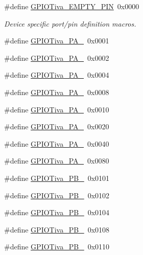 \begin{DoxyCompactItemize}
\item 
\#define \hyperlink{_g_p_i_o_tiva_8h_a2ec92551d8befb95d45bd4538cb551ff}{G\+P\+I\+O\+Tiva\+\_\+\+E\+M\+P\+T\+Y\+\_\+\+P\+I\+N}~0x0000
\begin{DoxyCompactList}\small\item\em Device specific port/pin definition macros. \end{DoxyCompactList}\item 
\#define \hyperlink{_g_p_i_o_tiva_8h_a27f805bf4a5d9103e4b274b21cc11c80}{G\+P\+I\+O\+Tiva\+\_\+\+P\+A\+\_}~0x0001
\item 
\#define \hyperlink{_g_p_i_o_tiva_8h_adcde1aba086cdeafa794b83300f1045a}{G\+P\+I\+O\+Tiva\+\_\+\+P\+A\+\_}~0x0002
\item 
\#define \hyperlink{_g_p_i_o_tiva_8h_afe7750cc0993a40eea174d8c884ebba8}{G\+P\+I\+O\+Tiva\+\_\+\+P\+A\+\_}~0x0004
\item 
\#define \hyperlink{_g_p_i_o_tiva_8h_a09f86a3824ca5fc59980cdc2a418ec14}{G\+P\+I\+O\+Tiva\+\_\+\+P\+A\+\_}~0x0008
\item 
\#define \hyperlink{_g_p_i_o_tiva_8h_a483f222ad65ae289af0ee4ee77f7572b}{G\+P\+I\+O\+Tiva\+\_\+\+P\+A\+\_}~0x0010
\item 
\#define \hyperlink{_g_p_i_o_tiva_8h_aff965c369c61586fcbf586066e154497}{G\+P\+I\+O\+Tiva\+\_\+\+P\+A\+\_}~0x0020
\item 
\#define \hyperlink{_g_p_i_o_tiva_8h_adb96d60aaa5ce688b602c543c1c3f554}{G\+P\+I\+O\+Tiva\+\_\+\+P\+A\+\_}~0x0040
\item 
\#define \hyperlink{_g_p_i_o_tiva_8h_aa894d37cf26b3c87e248be4a3a645d2b}{G\+P\+I\+O\+Tiva\+\_\+\+P\+A\+\_}~0x0080
\item 
\#define \hyperlink{_g_p_i_o_tiva_8h_aea38354a42e3ad6b9d446dd55e416549}{G\+P\+I\+O\+Tiva\+\_\+\+P\+B\+\_}~0x0101
\item 
\#define \hyperlink{_g_p_i_o_tiva_8h_a8b4d5da854e58d6afff1c2fb05603fe7}{G\+P\+I\+O\+Tiva\+\_\+\+P\+B\+\_}~0x0102
\item 
\#define \hyperlink{_g_p_i_o_tiva_8h_ad29e9080d48e4d1d3a033c8842f1b647}{G\+P\+I\+O\+Tiva\+\_\+\+P\+B\+\_}~0x0104
\item 
\#define \hyperlink{_g_p_i_o_tiva_8h_a297368b5dfbf57c89709daa92f2ce0eb}{G\+P\+I\+O\+Tiva\+\_\+\+P\+B\+\_}~0x0108
\item 
\#define \hyperlink{_g_p_i_o_tiva_8h_a4572326f47642cc760e69da44efa228b}{G\+P\+I\+O\+Tiva\+\_\+\+P\+B\+\_}~0x0110
\item 

\end{DoxyCompactItemize}
